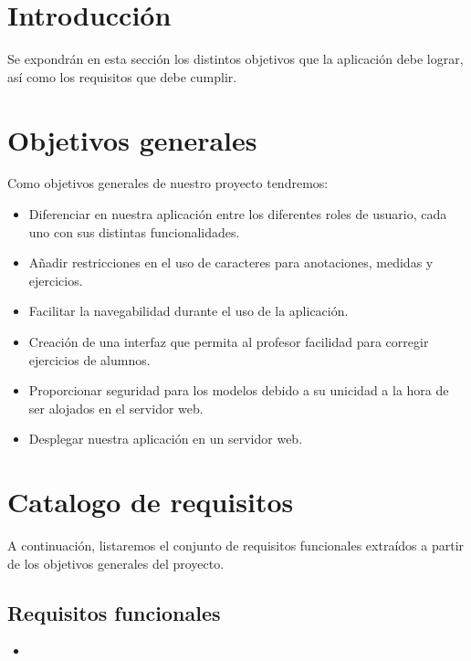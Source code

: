 
\section{Introducción}
Se expondrán en esta sección los distintos objetivos que la aplicación debe lograr, así como los requisitos que debe cumplir.

\section{Objetivos generales}
Como objetivos generales de nuestro proyecto tendremos:
\begin{itemize}
	\item Diferenciar en nuestra aplicación entre los diferentes roles de usuario, cada uno con sus distintas funcionalidades.
	\item Añadir restricciones en el uso de caracteres para anotaciones, medidas y ejercicios.
	\item Facilitar la navegabilidad durante el uso de la aplicación.
	\item Creación de una interfaz que permita al profesor facilidad para corregir ejercicios de alumnos.
	\item Proporcionar seguridad para los modelos debido a su unicidad a la hora de ser alojados en el servidor web.
	\item Desplegar nuestra aplicación en un servidor web.
\end{itemize}

\section{Catalogo de requisitos}
A continuación, listaremos el conjunto de requisitos funcionales extraídos a partir de los objetivos generales del proyecto.

\subsection{Requisitos funcionales}
\begin{itemize}
	\item 
\end{itemize}

